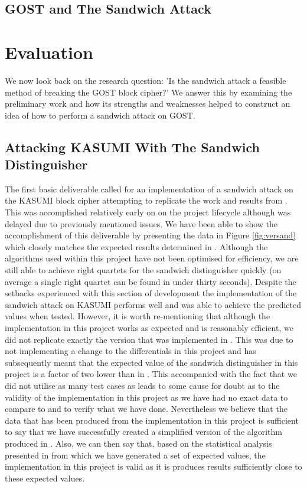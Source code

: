 \documentclass[10pt,journal,compsoc]{IEEEtran}
\begin{document}
\subsection{GOST and The Sandwich Attack}


\section{Evaluation}
We now look back on the research question: 'Is the sandwich attack a feasible method of breaking the GOST block cipher?' We answer this by examining the preliminary work and how its strengths and weaknesses helped to construct an idea of how to perform a sandwich attack on GOST.

\subsection{Attacking KASUMI With The Sandwich Distinguisher}
The first basic deliverable called for an implementation of a sandwich attack on the KASUMI block cipher attempting to replicate the work and results from \cite{jofc-2014-25962}. This was accomplished relatively early on on the project lifecycle although was delayed due to previously mentioned issues. We have been able to show the accomplishment of this deliverable by presenting the data in Figure \ref{fig:versand} which closely matches the expected results determined in \cite{jofc-2014-25962}. Although the algorithms used within this project have not been optimised for efficiency, we are still able to achieve right quartets for the sandwich distinguisher quickly (on average a single right quartet can be found in under thirty seconds). Despite the setbacks experienced with this section of development the implementation of the sandwich attack on KASUMI performs well and was able to achieve the predicted values when tested. However, it is worth re-mentioning that although the implementation in this project works as expected and is reasonably efficient, we did not replicate exactly the version that was implemented in \cite{jofc-2014-25962}. This was due to not implementing a change to the differentials in this project and has subsequently meant that the expected value of the sandwich distinguisher in this project is a factor of two lower than in \cite{jofc-2014-25962}. This accompanied with the fact that we did not utilise as many test cases as \cite{jofc-2014-25962} leads to some cause for doubt as to the validity of the implementation in this project as we have had no exact data to compare to and to verify what we have done. Nevertheless we believe that the data that has been produced from the implementation in this project is sufficient to say that we have successfully created a simplified version of the algorithm produced in \cite{jofc-2014-25962}. Also, we can then say that, based on the statistical analysis presented in \cite{jofc-2014-25962} from which we have generated a set of expected values, the implementation in this project is valid as it is produces results sufficiently close to these expected values.
\end{document}
